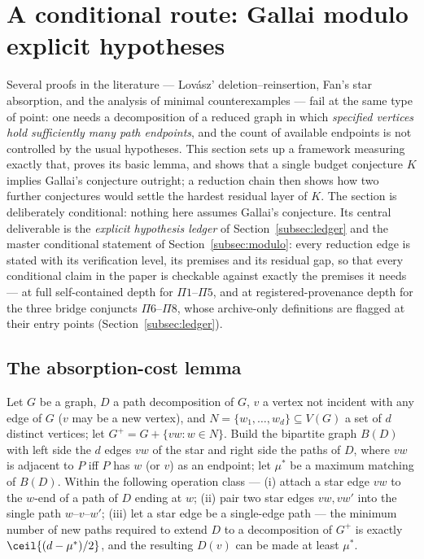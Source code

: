 \section{A conditional route: Gallai modulo explicit hypotheses}\label{sec:conditional}

Several proofs in the literature --- Lov\'asz' deletion--reinsertion, Fan's star absorption,
and the analysis of minimal counterexamples --- fail at the same type of point: one needs a
decomposition of a reduced graph in which \emph{specified vertices hold sufficiently many path
endpoints}, and the count of available endpoints is not controlled by the usual hypotheses.
This section sets up a framework measuring exactly that, proves its basic lemma, and shows that
a single budget conjecture $K$ implies Gallai's conjecture outright; a reduction chain then
shows how two further conjectures would settle the hardest residual layer of $K$. The section
is deliberately conditional: nothing here assumes Gallai's conjecture. Its central deliverable
is the \emph{explicit hypothesis ledger} of Section~\ref{subsec:ledger} and the master
conditional statement of Section~\ref{subsec:modulo}: every reduction edge is stated with its
verification level, its premises and its residual gap, so that every conditional claim in the
paper is checkable against exactly the premises it needs --- at full self-contained depth for
$\Pi1$--$\Pi5$, and at registered-provenance depth for the three bridge conjuncts
$\Pi6$--$\Pi8$, whose archive-only definitions are flagged at their entry points
(Section~\ref{subsec:ledger}).

\subsection{The absorption-cost lemma}\label{subsec:absorb}

\begin{lemma}\label{lem:T1}
Let $G$ be a graph, $D$ a path decomposition of $G$, $v$ a vertex not incident with any edge of
$G$ ($v$ may be a new vertex), and $N=\{w_1,\dots,w_d\}\subseteq V(G)$ a set of $d$ distinct
vertices; let $G^+=G+\{vw: w\in N\}$. Build the bipartite graph $B(D)$ with left side the $d$
edges $vw$ of the star and right side the paths of $D$, where $vw$ is adjacent to $P$ iff $P$
has $w$ (or $v$) as an endpoint; let $\mu^*$ be a maximum matching of $B(D)$. Within the
following operation class --- (i) attach a star edge $vw$ to the $w$-end of a path of $D$
ending at $w$; (ii) pair two star edges $vw,vw'$ into the single path $w$--$v$--$w'$; (iii) let
a star edge be a single-edge path --- the minimum number of new paths required to extend $D$ to
a decomposition of $G^+$ is exactly $\ceil{(d-\mu^*)/2}$, and the resulting $D(v)$ can be made
at least $\mu^*$.
\end{lemma}

